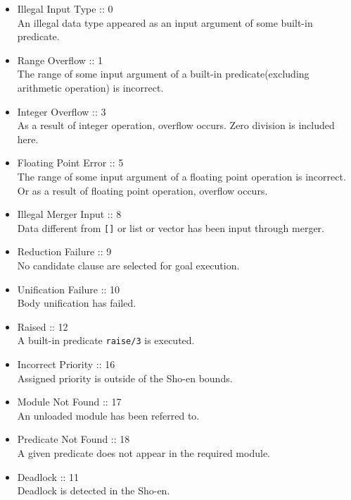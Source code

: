 \newpage
{}
\vspace{3ex}
\begin{itemize}

\item Illegal Input Type :: 0\\
An illegal data type appeared as an input argument of some built-in predicate.

\item Range Overflow :: 1\\
The range of some input argument of a built-in predicate(excluding arithmetic
operation) is incorrect.

\item Integer Overflow :: 3\\
As a result of integer operation, overflow occurs.
Zero division is included here.

\item Floating Point Error :: 5\\
The range of some input argument of a floating point operation is incorrect.
Or as a result of floating point operation, overflow occurs.

\item Illegal Merger Input :: 8\\
Data different from \verb|[]| or list or vector has been input through merger.

\item Reduction Failure :: 9\\
No candidate clause are selected for goal execution.

\item Unification Failure :: 10\\
Body unification has failed.

\item Raised :: 12\\
A built-in predicate \verb|raise/3| is executed.

\item Incorrect Priority :: 16\\
Assigned priority is outside of the Sho-en bounds.

\item Module Not Found :: 17\\
An unloaded module has been referred to.

\item Predicate Not Found :: 18\\
A given predicate does not appear in the required module.

\item Deadlock :: 11\\
Deadlock is detected in the Sho-en.
\end{itemize}
\vspace{5ex}

